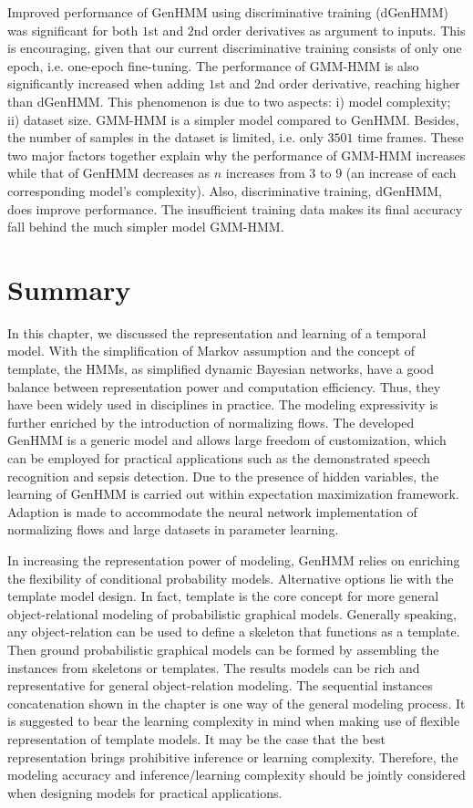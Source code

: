 Improved performance of GenHMM using discriminative training (dGenHMM) was significant for both $1$st and $2$nd order derivatives as argument to inputs.
This is encouraging, given that our current discriminative training consists of only one epoch, i.e. one-epoch fine-tuning.
The performance of GMM-HMM is also significantly increased when adding $1$st and $2$nd order derivative, reaching higher than dGenHMM.
This phenomenon is due to two aspects: i) model complexity; ii) dataset size. GMM-HMM is a simpler model compared to GenHMM. Besides, the number of samples in the dataset is limited, i.e. only $3501$ time frames. These two major factors together explain why the performance of GMM-HMM increases while that of GenHMM decreases as $n$ increases from $3$ to $9$ (an increase of each corresponding model's complexity).
Also, discriminative training, dGenHMM, does improve performance. The insufficient training data makes its final accuracy fall behind the much simpler model GMM-HMM.

\section{Summary}
In this chapter, we discussed the representation and learning of a temporal model. With the simplification of Markov assumption and the concept of template, the HMMs, as simplified dynamic Bayesian networks, have a good balance between representation power and computation efficiency. Thus, they have been widely used in disciplines in practice. The modeling expressivity is further enriched by the introduction of normalizing flows. The developed GenHMM is a generic model and allows large freedom of customization, which can be employed for practical applications such as the demonstrated speech recognition and sepsis detection. Due to the presence of hidden variables, the learning of GenHMM is carried out within expectation maximization framework. Adaption is made to accommodate the neural network implementation of normalizing flows and large datasets in parameter learning.

In increasing the representation power of modeling, GenHMM relies on enriching the flexibility of conditional probability models. Alternative options lie with the template model design. In fact, template is the core concept for more general object-relational modeling of probabilistic graphical models. Generally speaking, any object-relation can be used to define a skeleton that functions as a template. Then ground probabilistic graphical models can be formed by assembling the instances from skeletons or templates. The results models can be rich and representative for general object-relation modeling. The sequential instances concatenation shown in the chapter is one way of the general modeling process. It is suggested to bear the learning complexity in mind when making use of flexible representation of template models. It may be the case that the best representation brings prohibitive inference or learning complexity. Therefore, the modeling accuracy and inference/learning complexity should be jointly considered when designing models for practical applications.

